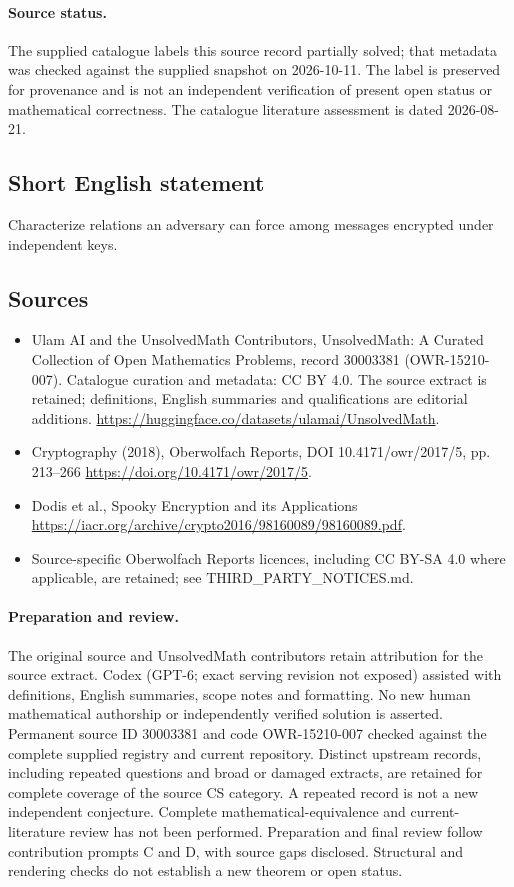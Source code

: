 \documentclass[11pt]{article}
\begin{document}
\paragraph{Source status.}
The supplied catalogue labels this source record partially solved; that metadata was checked against the supplied snapshot on 2026-10-11. The label is preserved for provenance and is not an independent verification of present open status or mathematical correctness. The catalogue literature assessment is dated 2026-08-21.
\subsection{Short English statement}
Characterize relations an adversary can force among messages encrypted under independent keys.
\subsection{Sources}
\begin{itemize}
\item[S1] Ulam AI and the UnsolvedMath Contributors, UnsolvedMath: A Curated Collection of Open Mathematics Problems, record 30003381 (OWR-15210-007). Catalogue curation and metadata: CC BY 4.0. The source extract is retained; definitions, English summaries and qualifications are editorial additions.
\url{https://huggingface.co/datasets/ulamai/UnsolvedMath}.
\item[S2] Cryptography (2018), Oberwolfach Reports, DOI 10.4171/owr/2017/5, pp. 213--266
\url{https://doi.org/10.4171/owr/2017/5}.
\item[S3] Dodis et al., Spooky Encryption and its Applications
\url{https://iacr.org/archive/crypto2016/98160089/98160089.pdf}.
\item Source-specific Oberwolfach Reports licences, including CC BY-SA 4.0 where applicable, are retained; see THIRD\_PARTY\_NOTICES.md.
\end{itemize}
\paragraph{Preparation and review.}
The original source and UnsolvedMath contributors retain attribution for the source extract. Codex (GPT-6; exact serving revision not exposed) assisted with definitions, English summaries, scope notes and formatting. No new human mathematical authorship or independently verified solution is asserted. Permanent source ID 30003381 and code OWR-15210-007 checked against the complete supplied registry and current repository. Distinct upstream records, including repeated questions and broad or damaged extracts, are retained for complete coverage of the source CS category. A repeated record is not a new independent conjecture. Complete mathematical-equivalence and current-literature review has not been performed. Preparation and final review follow contribution prompts C and D, with source gaps disclosed. Structural and rendering checks do not establish a new theorem or open status.
\label{end:30003381}
\end{document}
